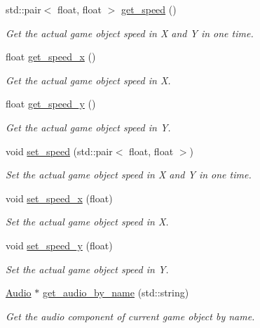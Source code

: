\begin{DoxyCompactItemize}
std\+::pair$<$ float, float $>$ \hyperlink{classengine_1_1_game_object_a62df587f097d4d7890a24687cc7ae2ab}{get\+\_\+speed} ()
\begin{DoxyCompactList}\small\item\em Get the actual game object speed in X and Y in one time. \end{DoxyCompactList}\item 
float \hyperlink{classengine_1_1_game_object_a3efe26ba32b16b65ec2b46e0bc6f8bbc}{get\+\_\+speed\+\_\+x} ()
\begin{DoxyCompactList}\small\item\em Get the actual game object speed in X. \end{DoxyCompactList}\item 
float \hyperlink{classengine_1_1_game_object_abaacf952522ecc92a47498eca2bac437}{get\+\_\+speed\+\_\+y} ()
\begin{DoxyCompactList}\small\item\em Get the actual game object speed in Y. \end{DoxyCompactList}\item 
void \hyperlink{classengine_1_1_game_object_a2485b78a86a188c489382180ae8c0f84}{set\+\_\+speed} (std\+::pair$<$ float, float $>$)
\begin{DoxyCompactList}\small\item\em Set the actual game object speed in X and Y in one time. \end{DoxyCompactList}\item 
void \hyperlink{classengine_1_1_game_object_acec07e80e5a5b83185a2c84d74393bfd}{set\+\_\+speed\+\_\+x} (float)
\begin{DoxyCompactList}\small\item\em Set the actual game object speed in X. \end{DoxyCompactList}\item 
void \hyperlink{classengine_1_1_game_object_a62ba05459de448237e6de79eb9cb1557}{set\+\_\+speed\+\_\+y} (float)
\begin{DoxyCompactList}\small\item\em Set the actual game object speed in Y. \end{DoxyCompactList}\item 
\hyperlink{classengine_1_1_audio}{Audio} $\ast$ \hyperlink{classengine_1_1_game_object_a8f0543e762ba71c9e094e791ce4bc065}{get\+\_\+audio\+\_\+by\+\_\+name} (std\+::string)
\begin{DoxyCompactList}\small\item\em Get the audio component of current game object by name. \end{DoxyCompactList}\item 

\end{DoxyCompactItemize}
